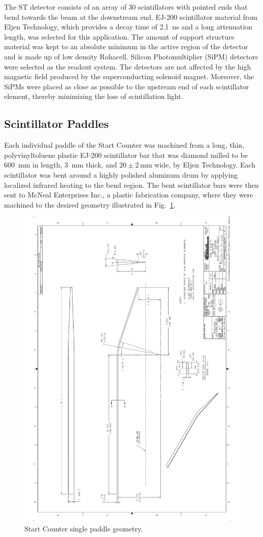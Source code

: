 The ST detector consists of an array of 30 scintillators with pointed ends that bend towards the beam at the downstream end. EJ-200 scintillator material from Eljen Technology\cite{eljen}, which provides a decay time of 2.1~ns and a long attenuation length\cite{ej200_specs}, was selected for this application.  The amount of support structure material was kept to an absolute minimum in the active region of the detector and is made up of low density Rohacell\cite{rohacell}. Silicon Photomultiplier (SiPM) detectors were selected as the readout system. The detectors are not affected by the high magnetic field produced by the superconducting solenoid magnet. Moreover, the SiPMs were placed as close as possible to the upstream end of each scintillator element, thereby minimizing the loss of scintillation light\cite{pooser16}.

\subsection{Scintillator Paddles}

Each individual paddle of the Start Counter was machined from a long, thin, polyvinyltoluene plastic EJ-200 scintillator bar that was diamond milled to be 600~mm in length, 3~mm thick, and $\mathrm{20 \pm 2\ mm}$ wide, by Eljen Technology.  Each scintillator was bent around a highly polished aluminum drum by applying localized infrared heating to the bend region.  The bent scintillator bars were then sent to McNeal Enterprises Inc.\cite{mcneal}, a plastic fabrication company, where they were machined to the desired geometry illustrated in Fig.~\ref{fig:Scintillator Geometry}.
\begin{figure}[!htb]
	\centering
	\includegraphics[width=0.7\columnwidth,angle=270.]{design/figs/Scint_Geo}
	\caption[Start Counter single paddle geometry]{Start Counter single paddle geometry.}
	\label{fig:Scintillator Geometry}
\end{figure}

